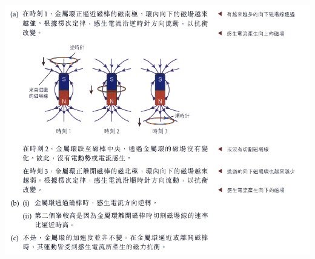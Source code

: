 {
    \clearpage
}{
    \par{\par\centering\includegraphics[width=\textwidth]{./img/ch5_induction_lq_2024-06-24-16-15-31.png}\par}
}

